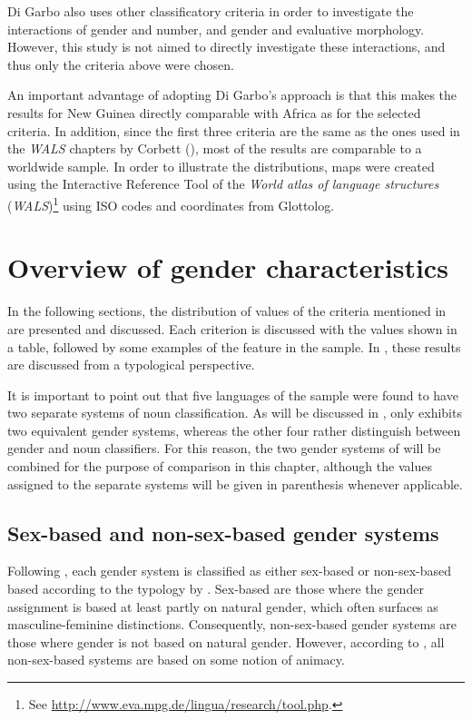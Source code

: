 \documentclass[output=collectionpaper]{langsci/langscibook}
\begin{document}
Di Garbo also uses other classificatory criteria in order to investigate the interactions of gender and number, and gender and evaluative morphology. However, this study is not aimed to directly investigate these interactions, and thus only the criteria above were chosen.


An important advantage of adopting Di Garbo's approach is that this makes the results for New Guinea directly comparable with Africa as for the selected criteria. In addition, since the first three criteria are the same as the ones used in the \textit{WALS} chapters by Corbett (\citealt{Corbett2013,Corbett2013a,Corbett2013b}), most of the results are comparable to a worldwide sample. In order to illustrate the distributions, maps were created using the Interactive Reference Tool of the \textit{World atlas of language structures} (\textit{WALS})\footnote{See \url{http://www.eva.mpg.de/lingua/research/tool.php}.} using ISO codes and coordinates from Glottolog.

\section{Overview of gender characteristics}
\label{sec:Svard:3}

In the following sections, the distribution of values of the criteria mentioned in  are presented and discussed. Each criterion is discussed with the values shown in a table, followed by some examples of the feature in the sample. In , these results are discussed from a typological perspective.

It is important to point out that five languages of the sample were found to have two separate systems of noun classification. As will be discussed in , only  exhibits two equivalent gender systems, whereas the other four rather distinguish between gender and noun classifiers. For this reason, the two gender systems of  will be combined for the purpose of comparison in this chapter, although the values assigned to the separate systems will be given in parenthesis whenever applicable.

\subsection{Sex-based and non-sex-based gender systems}
\label{sec:Svard:3.1}

Following \citet[62]{DiGarbo2014}, each gender system is classified as either sex-based or non-sex-based based according to the typology by \citet{Corbett2013b}. Sex-based are those where the gender assignment is based at least partly on natural gender, which often surfaces as masculine-feminine distinctions. Consequently, non-sex-based gender systems are those where gender is not based on natural gender. However, according to \citet{Corbett2013b}, all non-sex-based systems are based on some notion of animacy.
\end{document}
